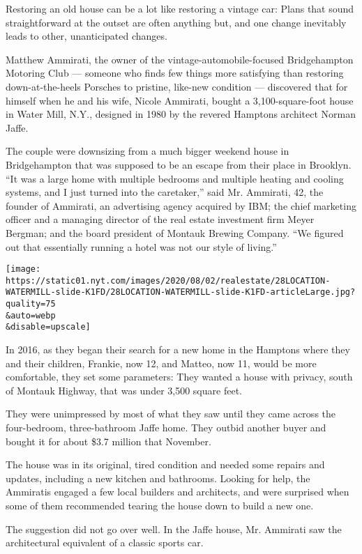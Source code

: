 Restoring an old house can be a lot like restoring a vintage car: Plans
that sound straightforward at the outset are often anything but, and one
change inevitably leads to other, unanticipated changes.

Matthew Ammirati, the owner of the vintage-automobile-focused
Bridgehampton Motoring Club --- someone who finds few things more
satisfying than restoring down-at-the-heels Porsches to pristine,
like-new condition --- discovered that for himself when he and his wife,
Nicole Ammirati, bought a 3,100-square-foot house in Water Mill, N.Y.,
designed in 1980 by the revered Hamptons architect Norman Jaffe.

The couple were downsizing from a much bigger weekend house in
Bridgehampton that was supposed to be an escape from their place in
Brooklyn. ``It was a large home with multiple bedrooms and multiple
heating and cooling systems, and I just turned into the caretaker,''
said Mr. Ammirati, 42, the founder of Ammirati, an advertising agency
acquired by IBM; the chief marketing officer and a managing director of
the real estate investment firm Meyer Bergman; and the board president
of Montauk Brewing Company. ``We figured out that essentially running a
hotel was not our style of living.''

\texttt{[image: https://static01.nyt.com/images/2020/08/02/realestate/28LOCATION-WATERMILL-slide-K1FD/28LOCATION-WATERMILL-slide-K1FD-articleLarge.jpg?quality=75\\\&auto=webp\\\&disable=upscale]}

In 2016, as they began their search for a new home in the Hamptons where
they and their children, Frankie, now 12, and Matteo, now 11, would be
more comfortable, they set some parameters: They wanted a house with
privacy, south of Montauk Highway, that was under 3,500 square feet.

They were unimpressed by most of what they saw until they came across
the four-bedroom, three-bathroom Jaffe home. They outbid another buyer
and bought it for about \$3.7 million that November.

The house was in its original, tired condition and needed some repairs
and updates, including a new kitchen and bathrooms. Looking for help,
the Ammiratis engaged a few local builders and architects, and were
surprised when some of them recommended tearing the house down to build
a new one.

The suggestion did not go over well. In the Jaffe house, Mr. Ammirati
saw the architectural equivalent of a classic sports car.

